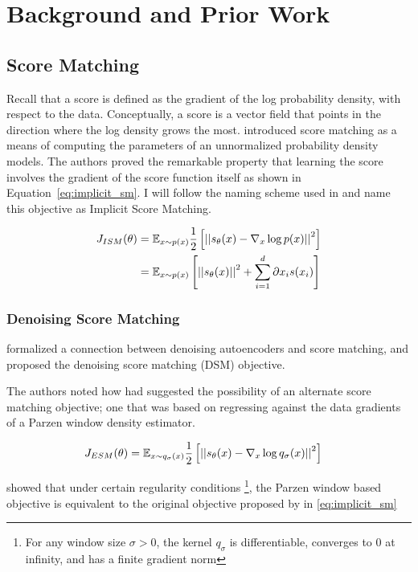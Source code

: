 \chapter{Background and Prior Work}

\section{Score Matching}
Recall that a score is defined as the gradient of the log probability density, with respect to the data. Conceptually, a score is a vector field that points in the direction where the log density grows the most. 
\cite{hyvarinen2005} introduced score matching as a means of computing the parameters of an unnormalized probability density models. The authors proved the remarkable property that learning the score involves the gradient of the score function itself as shown in Equation~\ref{eq:implicit_sm}. I will follow the naming scheme used in  and name this objective as Implicit Score Matching.

\begin{align}
\label{eq:implicit_sm}
    J_{ISM}(\theta) &= \mathbb{E}_{x \sim p(x)} \frac{1}{2} \left[ { \left|\left| {s_\theta(x) - \nabla_x \log p(x) } \right|\right|^2 } \right] \\
    &= \mathbb{E}_{x \sim p(x)} \left[ { \left|\left| {s_\theta(x)} \right|\right|^2 + \sum^{d}_{i=1}{\partial{x_{i}} s(x_{i}) } } \right]
\end{align}


\subsection{Denoising Score Matching}

 formalized a connection between denoising autoencoders and score matching, and proposed the denoising score matching (DSM) objective.

The authors noted how  had suggested the possibility of an alternate score matching objective; one that was based on regressing against the data gradients of a Parzen window density estimator.

\begin{align}
\label{eq:explicit_sm}
    J_{ESM}(\theta) &= \mathbb{E}_{x \sim q_{\sigma}(x)} \frac{1}{2} \left[ { \left|\left| {s_\theta(x) - \nabla_x \log q_{\sigma}(x) } \right|\right|^2 } \right]
\end{align}

 showed that under certain regularity conditions
\footnote{For any window size $\sigma > 0$, the kernel $q_{\sigma}$ is differentiable, converges to 0 at infinity, and has a finite gradient norm},
the Parzen window based objective is equivalent to the original objective proposed by  in \eqref{eq:implicit_sm}


